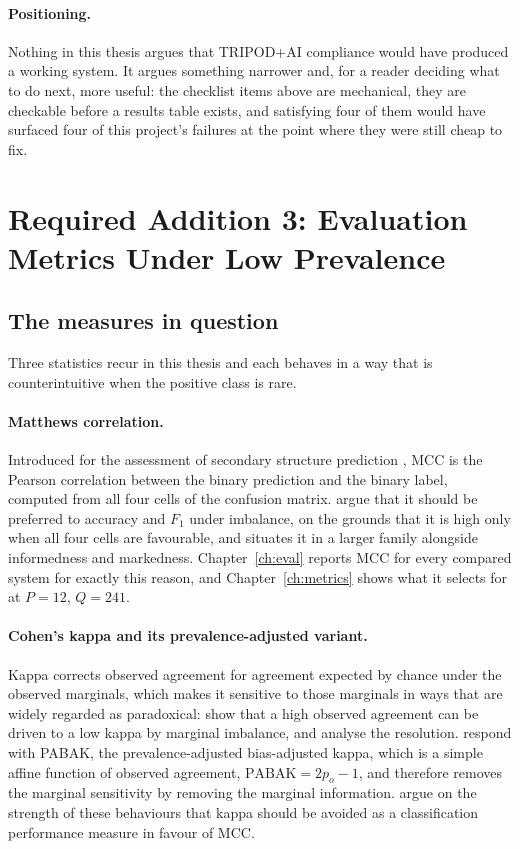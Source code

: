 \paragraph{Positioning.} Nothing in this thesis argues that TRIPOD+AI compliance
would have produced a working system. It argues something narrower and, for a
reader deciding what to do next, more useful: the checklist items above are
mechanical, they are checkable before a results table exists, and satisfying
four of them would have surfaced four of this project's failures at the point
where they were still cheap to fix.

\section{Required Addition 3: Evaluation Metrics Under Low Prevalence}
\label{sec:bg-metrics}

\subsection{The measures in question}

Three statistics recur in this thesis and each behaves in a way that is
counterintuitive when the positive class is rare.

\paragraph{Matthews correlation.} Introduced for the assessment of secondary
structure prediction \citep{matthews1975mcc}, MCC is the Pearson correlation
between the binary prediction and the binary label, computed from all four cells
of the confusion matrix. \citet{chicco2020mcc} argue that it should be preferred
to accuracy and $F_1$ under imbalance, on the grounds that it is high only when
all four cells are favourable, and \citet{powers2011evaluation} situates it in a
larger family alongside informedness and markedness. Chapter~\ref{ch:eval}
reports MCC for every compared system for exactly this reason, and
Chapter~\ref{ch:metrics} shows what it selects for at $P = 12$, $Q = 241$.

\paragraph{Cohen's kappa and its prevalence-adjusted variant.} Kappa
\citep{cohen1960kappa} corrects observed agreement for agreement expected by
chance under the observed marginals, which makes it sensitive to those
marginals in ways that are widely regarded as paradoxical:
\citet{feinstein1990paradoxes} show that a high observed agreement can be driven
to a low kappa by marginal imbalance, and \citet{cicchetti1990resolving} analyse
the resolution. \citet{byrt1993pabak} respond with PABAK, the
prevalence-adjusted bias-adjusted kappa, which is a simple affine function of
observed agreement, $\mathrm{PABAK} = 2p_o - 1$, and therefore removes the
marginal sensitivity by removing the marginal information.
\citet{delgado2019kappa} argue on the strength of these behaviours that kappa
should be avoided as a classification performance measure in favour of MCC.

